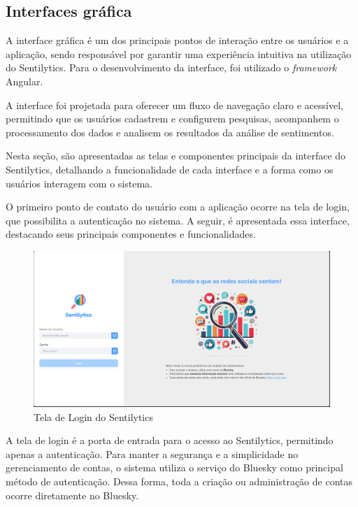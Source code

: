 \documentclass[
	12pt,				%
	oneside,			%
	a4paper,			%
	english,			%
	french,				%
	spanish,			%
	brazil				%
	]{abntex2}
\begin{document}
\hypertarget{interfaces-gruxe1fica}{%
\subsection{Interfaces gráfica}\label{interfaces-gruxe1fica}}

A interface gráfica é um dos principais pontos de interação entre os
usuários e a aplicação, sendo responsável por garantir uma experiência
intuitiva na utilização do Sentilytics. Para o desenvolvimento da
interface, foi utilizado o \emph{framework} Angular.

A interface foi projetada para oferecer um fluxo de navegação claro e
acessível, permitindo que os usuários cadastrem e configurem pesquisas,
acompanhem o processamento dos dados e analisem os resultados da análise
de sentimentos.

Nesta seção, são apresentadas as telas e componentes principais da
interface do Sentilytics, detalhando a funcionalidade de cada interface
e a forma como os usuários interagem com o sistema.

O primeiro ponto de contato do usuário com a aplicação ocorre na tela de
login, que possibilita a autenticação no sistema. A seguir, é
apresentada essa interface, destacando seus principais componentes e
funcionalidades.

\begin{figure}[htbp]
\hypertarget{tela_login}{%
\caption{Tela de Login do Sentilytics}\label{tela_login}
\begin{center}
\includegraphics[scale=0.2]{imagens/sentilytics/interface-grafica/tela-login.png}
\end{center}
}
\end{figure}

A tela de login é a porta de entrada para o acesso ao Sentilytics,
permitindo apenas a autenticação. Para manter a segurança e a
simplicidade no gerenciamento de contas, o sistema utiliza o serviço do
Bluesky como principal método de autenticação. Dessa forma, toda a
criação ou administração de contas ocorre diretamente no Bluesky.
\end{document}

